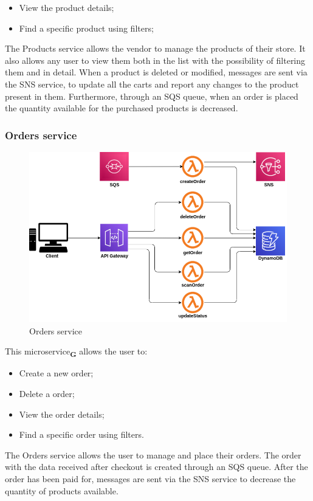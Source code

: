 \begin{itemize}
    \item View the product details;
    \item Find a specific product using filters;
\end{itemize}
The Products service allows the vendor to manage the products of their store. It also allows any user to view them both in the list with the possibility of filtering them and in detail. When a product is deleted or modified, messages are sent via the SNS service, to update all the carts and report any changes to the product present in them. Furthermore, through an SQS queue, when an order is placed the quantity available for the purchased products is decreased.
\pagebreak
\subsubsection{Orders service}
\begin{figure}[!h]
    \vspace{5px}
    \includegraphics[scale=0.5]{../../../../Images/Diagrammi/maintainerManual/orderService.png}
    \centering
    \caption{Orders service}
\end{figure}
This microservice\textsubscript{\textbf{G}} allows the user to:
\begin{itemize}
    \item Create a new order;
    \item Delete a order;
    \item View the order details;
    \item Find a specific order using filters.
\end{itemize}
The Orders service allows the user to manage and place their orders.
The order with the data received after checkout is created through an SQS queue. After the order has been paid for, messages are sent via the SNS service to decrease the quantity of products available.
\pagebreak
